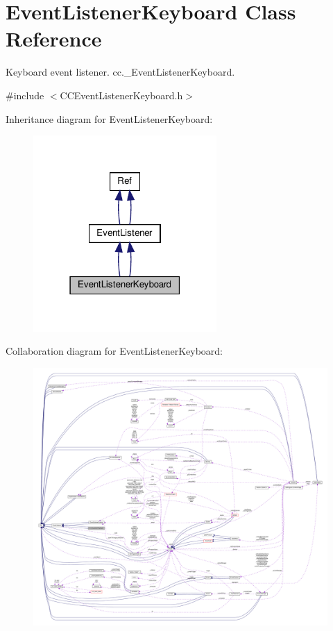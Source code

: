 \hypertarget{classEventListenerKeyboard}{}\section{Event\+Listener\+Keyboard Class Reference}
\label{classEventListenerKeyboard}


Keyboard event listener.  cc.\+\_\+\+Event\+Listener\+Keyboard.  




{\ttfamily \#include $<$C\+C\+Event\+Listener\+Keyboard.\+h$>$}



Inheritance diagram for Event\+Listener\+Keyboard\+:
\nopagebreak
\begin{figure}[H]
\begin{center}
\leavevmode
\includegraphics[width=198pt]{classEventListenerKeyboard__inherit__graph}
\end{center}
\end{figure}


Collaboration diagram for Event\+Listener\+Keyboard\+:
\nopagebreak
\begin{figure}[H]
\begin{center}
\leavevmode
\includegraphics[width=350pt]{classEventListenerKeyboard__coll__graph}
\end{center}
\end{figure}

